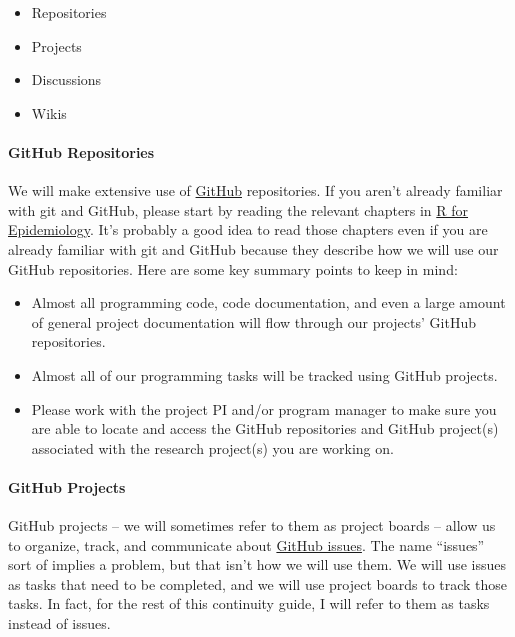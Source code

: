 \documentclass[
  letterpaper,
  DIV=11,
  numbers=noendperiod]{scrreprt}
\let\oldparagraph\paragraph
\renewcommand{\paragraph}[1]{\oldparagraph{#1}\mbox{}}
\providecommand{\tightlist}{%
  \setlength{\itemsep}{0pt}\setlength{\parskip}{0pt}}\usepackage{longtable,booktabs,array}
\begin{document}
\begin{itemize}
\tightlist
\item
  Repositories
\item
  Projects
\item
  Discussions
\item
  Wikis
\end{itemize}

\paragraph{GitHub Repositories}\label{github-repositories}

We will make extensive use of \href{https://github.com/}{GitHub}
repositories. If you aren't already familiar with git and GitHub, please
start by reading the relevant chapters in
\href{https://www.r4epi.com/introduction-to-git-and-github.html}{R for
Epidemiology}. It's probably a good idea to read those chapters even if
you are already familiar with git and GitHub because they describe how
we will use our GitHub repositories. Here are some key summary points to
keep in mind:

\begin{itemize}
\tightlist
\item
  Almost all programming code, code documentation, and even a large
  amount of general project documentation will flow through our
  projects' GitHub repositories.
\item
  Almost all of our programming tasks will be tracked using GitHub
  projects.
\item
  Please work with the project PI and/or program manager to make sure
  you are able to locate and access the GitHub repositories and GitHub
  project(s) associated with the research project(s) you are working on.
\end{itemize}

\paragraph{GitHub Projects}\label{github-projects}

GitHub projects -- we will sometimes refer to them as project boards --
allow us to organize, track, and communicate about
\href{https://docs.github.com/en/issues/tracking-your-work-with-issues/about-issues}{GitHub
issues}. The name ``issues'' sort of implies a problem, but that isn't
how we will use them. We will use issues as tasks that need to be
completed, and we will use project boards to track those tasks. In fact,
for the rest of this continuity guide, I will refer to them as tasks
instead of issues.
\end{document}
